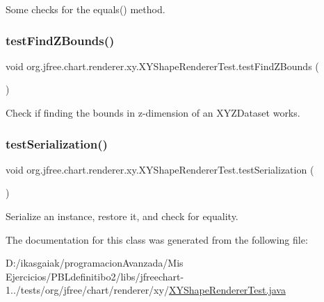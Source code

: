 Some checks for the equals() method. \mbox{\label{classorg_1_1jfree_1_1chart_1_1renderer_1_1xy_1_1_x_y_shape_renderer_test_a3d4a112504195a637049f41abc972a5a}} 
\subsubsection{\texorpdfstring{test\+Find\+Z\+Bounds()}{testFindZBounds()}}
{\footnotesize\ttfamily void org.\+jfree.\+chart.\+renderer.\+xy.\+X\+Y\+Shape\+Renderer\+Test.\+test\+Find\+Z\+Bounds (\begin{DoxyParamCaption}{ }\end{DoxyParamCaption})}

Check if finding the bounds in z-\/dimension of an X\+Y\+Z\+Dataset works. \mbox{\label{classorg_1_1jfree_1_1chart_1_1renderer_1_1xy_1_1_x_y_shape_renderer_test_a16ff4ee9da4bd77be6401dbb587d51e7}} 
\subsubsection{\texorpdfstring{test\+Serialization()}{testSerialization()}}
{\footnotesize\ttfamily void org.\+jfree.\+chart.\+renderer.\+xy.\+X\+Y\+Shape\+Renderer\+Test.\+test\+Serialization (\begin{DoxyParamCaption}{ }\end{DoxyParamCaption})}

Serialize an instance, restore it, and check for equality. 

The documentation for this class was generated from the following file\+:\begin{DoxyCompactItemize}
\item 
D\+:/ikasgaiak/programacion\+Avanzada/\+Mis Ejercicios/\+P\+B\+Ldefinitibo2/libs/jfreechart-\/1../tests/org/jfree/chart/renderer/xy/\mbox{\hyperlink{_x_y_shape_renderer_test_8java}{X\+Y\+Shape\+Renderer\+Test.\+java}}\end{DoxyCompactItemize}
